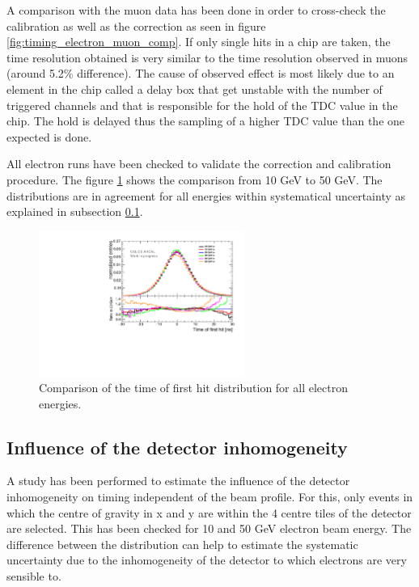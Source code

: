 A comparison with the muon data has been done in order to cross-check the calibration as well as the correction as seen in figure \ref{fig:timing_electron_muon_comp}. If only single hits in a chip are taken, the time resolution obtained is very similar to the time resolution observed in muons (around 5.2\% difference). The cause of observed effect is most likely due to an element in the chip called a delay box that get unstable with the number of triggered channels and that is responsible for the hold of the TDC value in the chip. The hold is delayed thus the sampling of a higher TDC value than the one expected is done.

All electron runs have been checked to validate the correction and calibration procedure. The figure \ref{fig:all_electron_energies} shows the comparison from 10 GeV to 50 GeV. The distributions are in agreement for all energies within systematical uncertainty as explained in subsection \ref{subsec:det_inhomo}.

\begin{figure}[htbp!]
	\centering
	\includegraphics[width=0.6\textwidth]{chap5/fig_AHCAL_timing/Electrons/ComparisonDataEnergies.pdf}
	\caption{Comparison of the time of first hit distribution for all electron energies.}
	\label{fig:all_electron_energies}
\end{figure}

\subsection{Influence of the detector inhomogeneity}
\label{subsec:det_inhomo}

A study has been performed to estimate the influence of the detector inhomogeneity on timing independent of the beam profile. For this, only events in which the centre of gravity in x and y are within the 4 centre tiles of the detector are selected. This has been checked for 10 and 50 GeV electron beam energy. The difference between the distribution can help to estimate the systematic uncertainty due to the inhomogeneity of the detector to which electrons are very sensible to.

